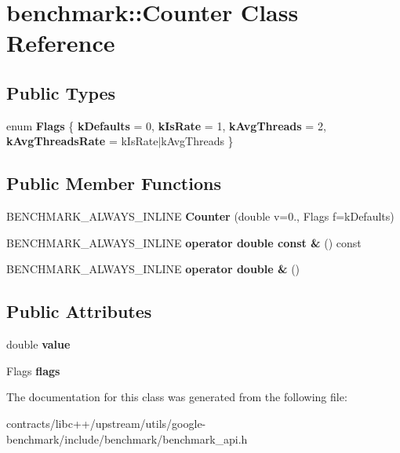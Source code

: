 \hypertarget{classbenchmark_1_1_counter}{}\section{benchmark\+:\+:Counter Class Reference}
\label{classbenchmark_1_1_counter}
\subsection*{Public Types}
\begin{DoxyCompactItemize}
\item 
\mbox{\label{classbenchmark_1_1_counter_a39dc8ef8557683263e9b548df5e87c0f}} 
enum {\bfseries Flags} \{ {\bfseries k\+Defaults} = 0, 
{\bfseries k\+Is\+Rate} = 1, 
{\bfseries k\+Avg\+Threads} = 2, 
{\bfseries k\+Avg\+Threads\+Rate} = k\+Is\+Rate$\vert$k\+Avg\+Threads
 \}
\end{DoxyCompactItemize}
\subsection*{Public Member Functions}
\begin{DoxyCompactItemize}
\item 
\mbox{\label{classbenchmark_1_1_counter_ae384155f32d68becb44b99d900156fb9}} 
B\+E\+N\+C\+H\+M\+A\+R\+K\+\_\+\+A\+L\+W\+A\+Y\+S\+\_\+\+I\+N\+L\+I\+NE {\bfseries Counter} (double v=0., Flags f=k\+Defaults)
\item 
\mbox{\label{classbenchmark_1_1_counter_a5f6753757be77616233ecfca19146a3a}} 
B\+E\+N\+C\+H\+M\+A\+R\+K\+\_\+\+A\+L\+W\+A\+Y\+S\+\_\+\+I\+N\+L\+I\+NE {\bfseries operator double const \&} () const
\item 
\mbox{\label{classbenchmark_1_1_counter_aeb9c13640bcdb0a38cce1445d07588bd}} 
B\+E\+N\+C\+H\+M\+A\+R\+K\+\_\+\+A\+L\+W\+A\+Y\+S\+\_\+\+I\+N\+L\+I\+NE {\bfseries operator double \&} ()
\end{DoxyCompactItemize}
\subsection*{Public Attributes}
\begin{DoxyCompactItemize}
\item 
\mbox{\label{classbenchmark_1_1_counter_ade980dffb0c0cb0032376b79f9fae964}} 
double {\bfseries value}
\item 
\mbox{\label{classbenchmark_1_1_counter_a782a84b11632526272f74f818963e7df}} 
Flags {\bfseries flags}
\end{DoxyCompactItemize}


The documentation for this class was generated from the following file\+:\begin{DoxyCompactItemize}
\item 
contracts/libc++/upstream/utils/google-\/benchmark/include/benchmark/benchmark\+\_\+api.\+h\end{DoxyCompactItemize}
